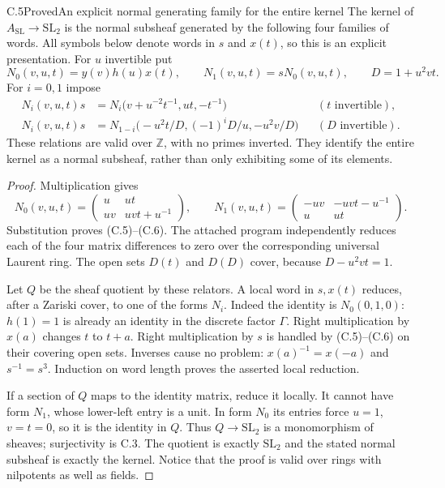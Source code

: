 \begin{statement}{C.5}{Proved}{An explicit normal generating family for the entire kernel}
The kernel of $A_{\mathrm{SL}}\to\mathrm{SL}_2$ is the normal subsheaf
generated by the following four families of words. All symbols below
denote words in $s$ and $x(t)$, so this is an explicit presentation.
For $u$ invertible put
\[
 N_0(v,u,t)=y(v)h(u)x(t),\qquad N_1(v,u,t)=sN_0(v,u,t),
 \qquad D=1+u^2vt.
\]
For $i=0,1$ impose
\begin{align}
 N_i(v,u,t)s&=N_i\bigl(v+u^{-2}t^{-1},ut,-t^{-1}\bigr)
                   &&(t\text{ invertible}),                    \tag{C.5}\\
 N_i(v,u,t)s&=N_{1-i}\bigl(-u^2t/D,(-1)^iD/u,-u^2v/D\bigr)
                   &&(D\text{ invertible}).                    \tag{C.6}
\end{align}
These relations are valid over $\mathbb Z$, with no primes inverted.
They identify the entire kernel as a normal subsheaf, rather than only
exhibiting some of its elements.
\end{statement}
\begin{proof}
Multiplication gives
\[
 N_0(v,u,t)=\begin{pmatrix}u&ut\\uv&uvt+u^{-1}\end{pmatrix},\qquad
 N_1(v,u,t)=\begin{pmatrix}-uv&-uvt-u^{-1}\\u&ut\end{pmatrix}.
\]
Substitution proves (C.5)--(C.6). The attached program independently
reduces each of the four matrix differences to zero over the
corresponding universal Laurent ring. The open sets $D(t)$ and $D(D)$
cover, because $D-u^2vt=1$.

Let $Q$ be the sheaf quotient by these relators. A local word in
$s,x(t)$ reduces, after a Zariski cover, to one of the forms $N_i$.
Indeed the identity is $N_0(0,1,0)$: $h(1)=1$ is already an identity
in the discrete factor $\Gamma$. Right multiplication by $x(a)$
changes $t$ to $t+a$. Right multiplication by $s$ is handled by
(C.5)--(C.6) on their covering open sets. Inverses cause no problem:
$x(a)^{-1}=x(-a)$ and $s^{-1}=s^3$. Induction on word length proves
the asserted local reduction.

If a section of $Q$ maps to the identity matrix, reduce it locally.
It cannot have form $N_1$, whose lower-left entry is a unit.
In form $N_0$ its entries force $u=1$, $v=t=0$, so it is the identity
in $Q$. Thus $Q\to\mathrm{SL}_2$ is a monomorphism of sheaves;
surjectivity is C.3. The quotient is exactly $\mathrm{SL}_2$ and
the stated normal subsheaf is exactly the kernel. Notice that the
proof is valid over rings with nilpotents as well as fields.
\end{proof}

